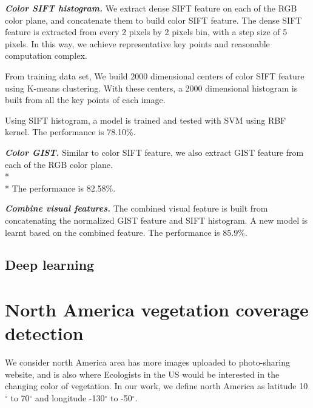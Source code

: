 \documentclass[10pt,twocolumn,letterpaper]{article}
\begin{document}
\textbf{\textit{Color SIFT histogram.}}
We extract dense SIFT feature on each of the RGB color plane, and concatenate them to build color SIFT feature. The dense SIFT feature is extracted from every 2 pixels by 2 pixels bin, with a step size of 5 pixels. In this way, we achieve representative key points and reasonable computation complex. 

From training data set, We build 2000 dimensional centers of color SIFT feature using K-means clustering. With these centers, a 2000 dimensional histogram is built from all the key points of each image.

Using SIFT histogram, a model is trained and tested with SVM using RBF kernel. 
The performance is 78.10\%.

\textbf{\textit{Color GIST.}}
Similar to color SIFT feature, we also extract GIST feature from each of the RGB color plane.\\*\\*
The performance is 82.58\%.

\textbf{\textit{Combine visual features.}}
The combined visual feature is built from concatenating the normalized GIST feature and SIFT histogram. A new model is learnt based on the combined feature.
The performance is 85.9\%.

\subsection{Deep learning}
\section{North America vegetation coverage detection}

We consider north America area has more images uploaded to photo-sharing website, and is also where Ecologists in the US would be interested in the changing color of vegetation. In our work, we define north America as latitude 10$^{\circ}$ to 70$^{\circ}$ and longitude -130$^{\circ}$ to -50$^{\circ}$.
\end{document}
